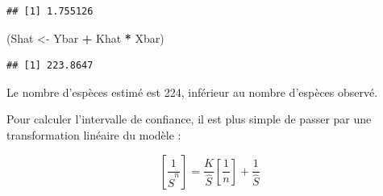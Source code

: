 \documentclass[
  11pt,
  french,
  a4paper,
  extrafontsizes,onecolumn,openright
  ]{memoir}
\newenvironment{Shaded}{\begin{snugshade}}{\end{snugshade}}
\newcommand{\CommentTok}[1]{\textcolor[rgb]{0.56,0.35,0.01}{\textit{#1}}}
\newcommand{\ControlFlowTok}[1]{\textcolor[rgb]{0.13,0.29,0.53}{\textbf{#1}}}
\newcommand{\DecValTok}[1]{\textcolor[rgb]{0.00,0.00,0.81}{#1}}
\newcommand{\FloatTok}[1]{\textcolor[rgb]{0.00,0.00,0.81}{#1}}
\newcommand{\KeywordTok}[1]{\textcolor[rgb]{0.13,0.29,0.53}{\textbf{#1}}}
\newcommand{\NormalTok}[1]{#1}
\newcommand{\OperatorTok}[1]{\textcolor[rgb]{0.81,0.36,0.00}{\textbf{#1}}}
\newcommand{\StringTok}[1]{\textcolor[rgb]{0.31,0.60,0.02}{#1}}
\begin{document}
\scriptsize

\begin{Shaded}
\end{Shaded}

\begin{verbatim}
## [1] 1.755126
\end{verbatim}

\begin{Shaded}
\begin{Highlighting}[]
\NormalTok{(Shat <-}\StringTok{ }\NormalTok{Ybar }\OperatorTok{+}\StringTok{ }\NormalTok{Khat }\OperatorTok{*}\StringTok{ }\NormalTok{Xbar)}
\end{Highlighting}
\end{Shaded}

\begin{verbatim}
## [1] 223.8647
\end{verbatim}

\normalsize

Le nombre d'espèces estimé est 224, inférieur au nombre d'espèces observé.

Pour calculer l'intervalle de confiance, il est plus simple de passer par une transformation linéaire du modèle \autocite{Lineweaver1934}:

\begin{equation}
  \label{eq:Lineweaver1934}
  \left[\frac{1}{\hat{S}^{n}}\right] = \frac{K}{\hat{S}}\left[\frac{1}{n}\right]+\frac{1}{\hat{S}} 
\end{equation}
\end{document}
